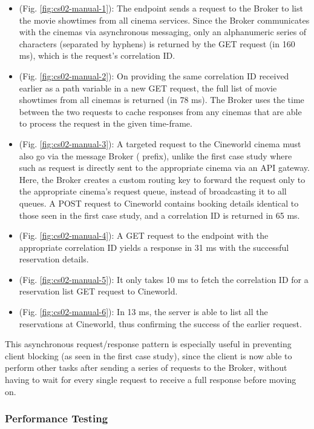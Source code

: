 \begin{itemize}
  \item {} (Fig. \ref{fig:cs02-manual-1}): The  endpoint sends a request to the Broker to list the movie showtimes from all cinema services. Since the Broker communicates with the cinemas via asynchronous messaging, only an alphanumeric series of characters (separated by hyphens) is returned by the GET request (in 160 ms), which is the request's correlation ID.

  \item {} (Fig. \ref{fig:cs02-manual-2}): On providing the same correlation ID received earlier as a path variable in a new GET request, the full list of movie showtimes from all cinemas is returned (in 78 ms). The Broker uses the time between the two requests to cache responses from any cinemas that are able to process the request in the given time-frame.

  \item {} (Fig. \ref{fig:cs02-manual-3}): A targeted request to the Cineworld cinema must also go via the message Broker ( prefix), unlike the first case study where such as request is directly sent to the appropriate cinema via an API gateway. Here, the Broker creates a custom routing key to forward the request only to the appropriate cinema's request queue, instead of broadcasting it to all queues. A POST request to Cineworld contains booking details identical to those seen in the first case study, and a correlation ID is returned in 65 ms.

  \item {} (Fig. \ref{fig:cs02-manual-4}): A GET request to the  endpoint with the appropriate correlation ID yields a response in 31 ms with the successful reservation details.

  \item {} (Fig. \ref{fig:cs02-manual-5}): It only takes 10 ms to fetch the correlation ID for a reservation list GET request to Cineworld.

  \item {} (Fig. \ref{fig:cs02-manual-6}): In 13 ms, the server is able to list all the reservations at Cineworld, thus confirming the success of the earlier  request.
\end{itemize}

This asynchronous request/response pattern is especially useful in preventing client blocking (as seen in the first case study), since the client is now able to perform other tasks after sending a series of requests to the Broker, without having to wait for every single request to receive a full response before moving on.


\subsubsection{Performance Testing}
